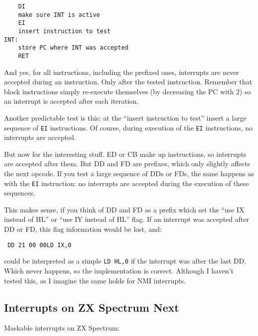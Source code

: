 \documentclass[12pt,twoside,openright,a4paper]{book}
\begin{document}
\begin{Verbatim}
	DI
	make sure INT is active
	EI
	insert instruction to test
INT:
	store PC where INT was accepted
	RET
\end{Verbatim}

And yes, for all instructions, including the prefixed ones, interrupts are never accepted during an instruction. Only after the tested instruction. Remember that block instructions simply re-execute themselves (by decreasing the PC with 2) so an interrupt is accepted after each iteration.

Another predictable test is this: at the ``insert instruction to test'' insert a large sequence of {\tt EI} instructions. Of course, during execution of the {\tt EI} instructions, no interrupts are accepted. 

But now for the interesting stuff. ED or CB make up instructions, so interrupts are accepted after them. But DD and FD are prefixes, which only slightly affects the next opcode. If you test a large sequence of DDs or FDs, the same happens as with the {\tt EI} instruction: no interrupts are accepted during the execution of these sequences.

This makes sense, if you think of DD and FD as a prefix which set the ``use IX instead of HL'' or ``use IY instead of HL'' flag. If an interrupt was accepted after DD or FD, this flag information would be lost, and:

{\tt 
	{\qquad}DD 21 00 00{\qquad}LD IX,0
}

could be interpreted as a simple {\tt LD HL,0} if the interrupt was after the last DD. Which never happens, so the implementation is correct. Although I haven't tested this, as I imagine the same holds for NMI interrupts.


\subsection{Interrupts on ZX Spectrum Next}

Maskable interrupts on ZX Spectrum:
\end{document}
